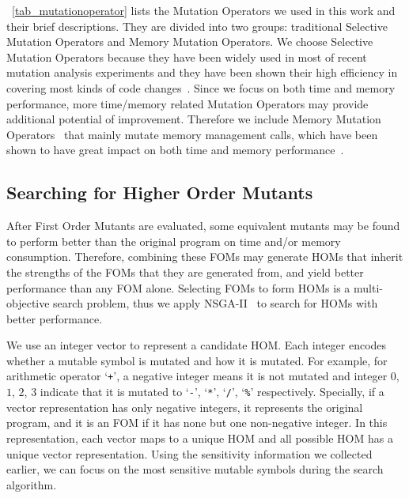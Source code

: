 \documentclass[oribibl]{llncs}
\begin{document}
\tablename~\ref{tab_mutationoperator} lists the Mutation Operators we used in this work and their brief descriptions.
They are divided into two groups: traditional Selective Mutation Operators and Memory Mutation Operators.
We choose Selective Mutation Operators because they have been widely used in most of recent mutation analysis experiments and they have been shown their high efficiency in covering most kinds of code changes~\cite{5487526}.
Since we focus on both time and memory performance, more time/memory related Mutation Operators may provide additional potential of improvement.
Therefore we include Memory Mutation Operators~\cite{7107449,Wu2016} that mainly mutate memory management calls, which have been shown to have great impact on both time and memory performance~\cite{Zorn:1992:EMS:142181.142200}.

\subsection{Searching for Higher Order Mutants}
\label{sec_hom}

After First Order Mutants are evaluated, some equivalent mutants may be found to perform better than the original program on time and/or memory consumption.
Therefore, combining these FOMs may generate HOMs that inherit the strengths of the FOMs that they are generated from, and yield better performance than any FOM alone.
Selecting FOMs to form HOMs is a multi-objective search problem, thus we apply NSGA-II~\cite{996017} to search for HOMs with better performance.

We use an integer vector to represent a candidate HOM.
Each integer encodes whether a mutable symbol is mutated and how it is mutated.
For example, for arithmetic operator `\texttt{+}', a negative integer means it is not mutated and integer $0$, $1$, $2$, $3$ indicate that it is mutated to `\texttt{-}', `\texttt{*}', `\texttt{/}', `\texttt{\%}' respectively.
Specially, if a vector representation has only negative integers, it represents the original program, and it is an FOM if it has none but one non-negative integer.
In this representation, each vector maps to a unique HOM and all possible HOM has a unique vector representation.
Using the sensitivity information we collected earlier, we can focus on the most sensitive mutable symbols during the search algorithm.
\end{document}
